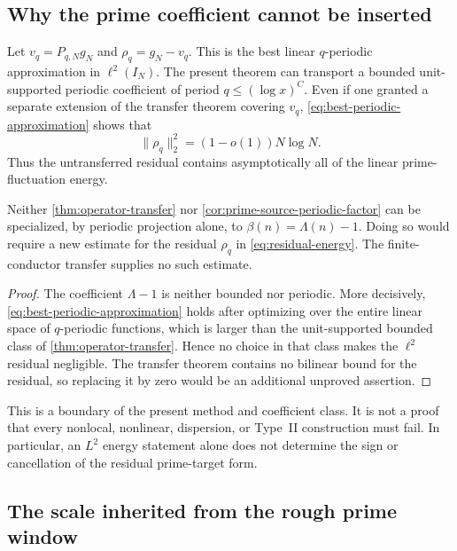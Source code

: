 \subsection{Why the prime coefficient cannot be inserted}

Let $v_q=P_{q,N}g_N$ and $\rho_q=g_N-v_q$.  This is the best linear
$q$-periodic approximation in $\ell^2(I_N)$.  The present theorem can
transport a bounded unit-supported periodic coefficient of period
$q\leq(\log x)^C$.  Even if one granted a separate extension of the
transfer theorem covering $v_q$, \eqref{eq:best-periodic-approximation}
shows that
\begin{equation}\label{eq:residual-energy}
 \|\rho_q\|_2^2=(1-o(1))N\log N.
\end{equation}
Thus the untransferred residual contains asymptotically all of the linear
prime-fluctuation energy.

\begin{proposition}
\label{prop:strict-nonspecialization}
Neither \cref{thm:operator-transfer} nor
\cref{cor:prime-source-periodic-factor} can be specialized, by periodic
projection alone, to $\beta(n)=\Lambda(n)-1$.  Doing so would require a new
estimate for the residual $\rho_q$ in \eqref{eq:residual-energy}.  The
finite-conductor transfer supplies no such estimate.
\end{proposition}

\begin{proof}
The coefficient $\Lambda-1$ is neither bounded nor periodic.  More
decisively, \eqref{eq:best-periodic-approximation} holds after optimizing
over the entire linear space of $q$-periodic functions, which is larger than
the unit-supported bounded class of \cref{thm:operator-transfer}.  Hence no
choice in that class makes the $\ell^2$ residual negligible.  The transfer
theorem contains no bilinear bound for the residual, so replacing it by zero
would be an additional unproved assertion.
\end{proof}

This is a boundary of the present method and coefficient class.  It is not a
proof that every nonlocal, nonlinear, dispersion, or Type~II construction
must fail.  In particular, an $L^2$ energy statement alone does not determine
the sign or cancellation of the residual prime-target form.

\subsection{The scale inherited from the rough prime window}

